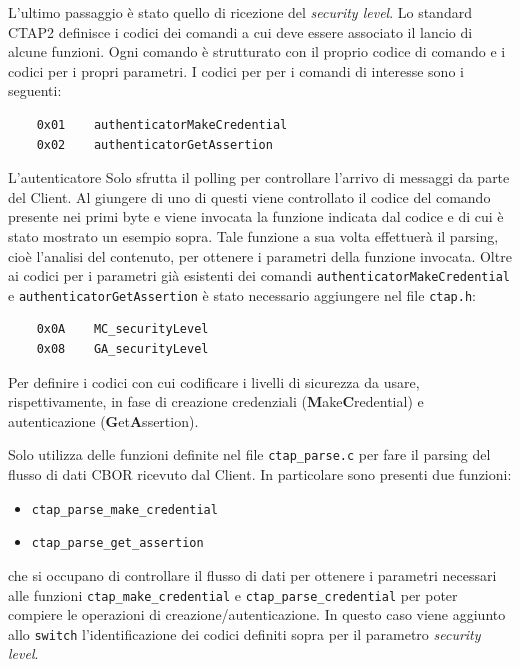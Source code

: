 L'ultimo passaggio è stato quello di ricezione del \emph{security level}. Lo standard CTAP2 \cite{fido:ctap_commands} definisce i codici dei comandi a cui deve essere associato il lancio di alcune funzioni. Ogni comando è strutturato con il proprio codice di comando e i codici per i propri parametri. I codici per per i comandi di interesse sono i seguenti: 
\begin{verbatim}
	0x01	authenticatorMakeCredential
	0x02	authenticatorGetAssertion
\end{verbatim}


L'autenticatore Solo sfrutta il polling per controllare l'arrivo di messaggi da parte del Client. Al giungere di uno di questi viene controllato il codice del comando presente nei primi byte e viene invocata la funzione indicata dal codice e di cui è stato mostrato un esempio sopra. Tale funzione a sua volta effettuerà il parsing, cioè l'analisi del contenuto, per ottenere i parametri della funzione invocata. Oltre ai codici per i parametri già esistenti dei comandi \verb*|authenticatorMakeCredential| e \verb*|authenticatorGetAssertion| è stato necessario aggiungere nel file \verb*|ctap.h|:
\begin{verbatim}
	0x0A	MC_securityLevel
	0x08	GA_securityLevel
\end{verbatim}
Per definire i codici con cui codificare i livelli di sicurezza da usare, rispettivamente, in fase di creazione credenziali (\textbf{M}ake\textbf{C}redential) e autenticazione (\textbf{G}et\textbf{A}ssertion). 

Solo utilizza delle funzioni definite nel file \verb*|ctap_parse.c| per fare il parsing del flusso di dati CBOR ricevuto dal Client. In particolare sono presenti due funzioni:
\begin{itemize}
	\item \verb*|ctap_parse_make_credential|
	\item \verb*|ctap_parse_get_assertion|
\end{itemize}

che si occupano di controllare il flusso di dati per ottenere i parametri necessari alle funzioni \verb*|ctap_make_credential| e \verb*|ctap_parse_credential| per poter compiere le operazioni di creazione/autenticazione. In questo caso viene aggiunto allo \verb*|switch| l'identificazione dei codici definiti sopra per il parametro \emph{security level}. 

